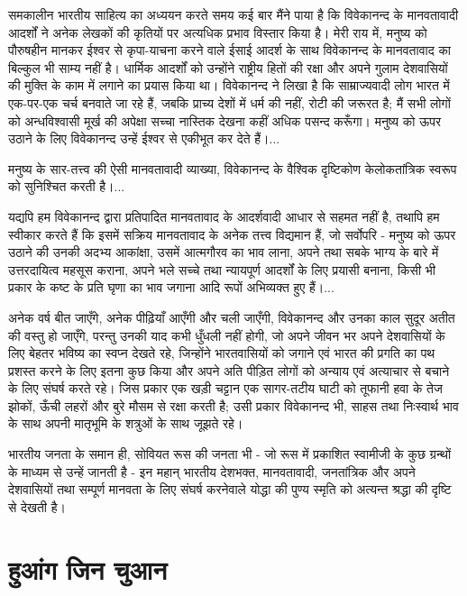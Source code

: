 समकालीन भारतीय साहित्य का अध्ययन करते समय कई बार मैंने पाया है कि विवेकानन्द के मानवतावादी आदर्शों ने अनेक लेखकों की कृतियों पर अत्यधिक प्रभाव विस्तार किया है। मेरी राय में, मनुष्य को पौरुषहीन मानकर ईश्वर से कृपा-याचना करने वाले ईसाई आदर्श के साथ विवेकानन्द के मानवतावाद का बिल्कुल भी साम्य नहीं है। धार्मिक आदर्शों को उन्होंने राष्ट्रीय हितों की रक्षा और अपने गुलाम देशवासियों की मुक्ति के काम में लगाने का प्रयास किया था। विवेकानन्द ने लिखा है कि साम्राज्यवादी लोग भारत में एक-पर-एक चर्च बनवाते जा रहे हैं, जबकि प्राच्य देशों में धर्म की नहीं, रोटी की जरूरत है; मैं सभी लोगों को अन्धविश्वासी मूर्ख की अपेक्षा सच्चा नास्तिक देखना कहीं अधिक पसन्द करूँगा। मनुष्य को ऊपर उठाने के लिए विवेकानन्द उन्हें ईश्वर से एकीभूत कर देते हैं।... 

मनुष्य के सार-तत्त्व की ऐसी मानवतावादी व्याख्या, विवेकानन्द के वैश्विक दृष्टिकोण के\break लोकतांत्रिक स्वरूप को सुनिश्चित करती है।... 

यद्यपि हम विवेकानन्द द्वारा प्रतिपादित मानवतावाद के आदर्शवादी आधार से सहमत नहीं है, तथापि हम स्वीकार करते हैं कि इसमें सक्रिय मानवतावाद के अनेक तत्त्व विद्यमान हैं, जो सर्वोपरि - मनुष्य को ऊपर उठाने की उनकी अदभ्य आकांक्षा, उसमें आत्मगौरव का भाव लाना, अपने तथा सबके भाग्य के बारे में उत्तरदायित्व महसूस कराना, अपने भले सच्चे तथा न्यायपूर्ण आदर्शों के लिए प्रयासी बनाना, किसी भी प्रकार के कष्ट के प्रति घृणा का भाव जगाना आदि रूपों अभिव्यक्त हुए हैं।... 

अनेक वर्ष बीत जाएँगे, अनेक पीढ़ियाँ आएँगी और चली जाएँगी, विवेकानन्द और उनका काल सुदूर अतीत की वस्तु हो जाएँगे, परन्तु उनकी याद कभी धुँधली नहीं होगी, जो अपने जीवन भर अपने देशवासियों के लिए बेहतर भविष्य का स्वप्न देखते रहे, जिन्होंने भारतवासियों को जगाने एवं भारत की प्रगति का पथ प्रशस्त करने के लिए इतना कुछ किया और अपने अति पीड़ित लोगों को अन्याय एवं अत्याचार से बचाने के लिए संघर्ष करते रहे। जिस प्रकार एक खड़ी चट्टान एक सागर-तटीय घाटी को तूफानी हवा के तेज झोकों, ऊँची लहरों और बुरे मौसम से रक्षा करती है; उसी प्रकार विवेकानन्द भी, साहस तथा निःस्वार्थ भाव के साथ अपनी मातृभूमि के शत्रुओं के साथ जूझते रहे। 

भारतीय जनता के समान ही, सोवियत रूस की जनता भी - जो रूस में प्रकाशित स्वामीजी के कुछ ग्रन्थों के माध्यम से उन्हें जानती है - इन महान् भारतीय देशभक्त, मानवतावादी, जनतांत्रिक और अपने देशवासियों तथा सम्पूर्ण मानवता के लिए संघर्ष करनेवाले योद्धा की पुण्य स्मृति को अत्यन्त श्रद्धा की दृष्टि से देखती है।


\section*{हुआंग जिन चुआन}

